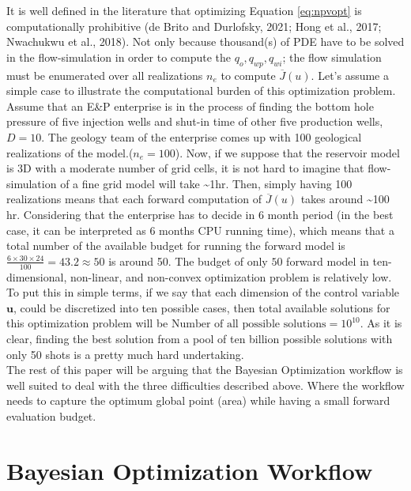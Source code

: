\documentclass[]{elsarticle} %
\begin{document}
It is well defined in the literature that optimizing Equation \eqref{eq:npvopt} is computationally prohibitive (de Brito and Durlofsky, 2021; Hong et al., 2017; Nwachukwu et al., 2018). Not only because thousand(s) of PDE have to be solved in the flow-simulation in order to compute the \(q_o, q_{wp}, q_{wi}\); the flow simulation must be enumerated over all realizations \(n_e\) to compute \(\overline{J}(u)\). Let's assume a simple case to illustrate the computational burden of this optimization problem. Assume that an E\&P enterprise is in the process of finding the bottom hole pressure of five injection wells and shut-in time of other five production wells, \(D=10\). The geology team of the enterprise comes up with 100 geological realizations of the model.(\(n_e=100\)). Now, if we suppose that the reservoir model is 3D with a moderate number of grid cells, it is not hard to imagine that flow-simulation of a fine grid model will take \textasciitilde1hr. Then, simply having 100 realizations means that each forward computation of \(\overline{J}(u)\) takes around \textasciitilde100 hr. Considering that the enterprise has to decide in 6 month period (in the best case, it can be interpreted as 6 months CPU running time), which means that a total number of the available budget for running the forward model is\(\frac{6 \times 30 \times 24 }{100}= 43.2 \approx 50\) is around 50. The budget of only \(50\) forward model in ten-dimensional, non-linear, and non-convex optimization problem is relatively low. To put this in simple terms, if we say that each dimension of the control variable \(\mathbf{u}\), could be discretized into ten possible cases, then total available solutions for this optimization problem will be \(\text {Number of all possible solutions} = 10^{10}\). As it is clear, finding the best solution from a pool of ten billion possible solutions with only 50 shots is a pretty much hard undertaking.\\

The rest of this paper will be arguing that the Bayesian Optimization workflow is well suited to deal with the three difficulties described above. Where the workflow needs to capture the optimum global point (area) while having a small forward evaluation budget.

\newpage

\hypertarget{bayesian-optimization-workflow}{%
\section{Bayesian Optimization Workflow}\label{bayesian-optimization-workflow}}
\end{document}
